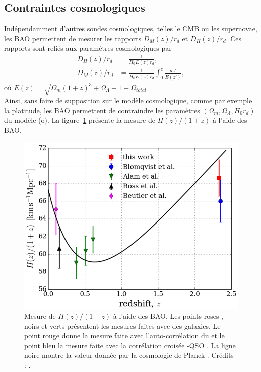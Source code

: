\subsection{Contraintes cosmologiques}
Indépendamment d'autres sondes cosmologiques, telles le CMB ou les supernovae, les BAO permettent de mesurer les rapports $D_M(z) / r_d$ et $D_H(z) / r_d$. Ces rapports sont reliés aux paramètres cosmologiques par
\begin{align}
  D_H(z) / r_d &= \frac{1}{H_0 E(z) r_d}, \\
  D_M(z) / r_d &= \frac{1}{H_0 E(z) r_d} \int_0^z \frac{dz'}{E(z')},
\end{align}
où $E(z) = \sqrt{\Omega_m (1+z)^3 + \Omega_{\Lambda} + 1 - \Omega_{total}}$. \\
Ainsi, sans faire de supposition sur le modèle cosmologique, comme par exemple la platitude, les BAO permettent de contraindre les paramètres $(\Omega_{m} , \Omega_{\Lambda} , H_0 r_d)$ du modèle (o)\lcdm{}.
La figure~\ref{fig:h_vs_z} présente la mesure de $H(z) / (1+z)$ à l'aide des BAO.
\begin{figure}
  \centering
  \includegraphics[scale=0.35]{h_vs_z}
  \caption{Mesure de $H(z) / (1+z)$ à l'aide des BAO. Les points roses \autocite{Beutler2011}, noirs \autocite{Ross2014a} et verts \autocite{Alam2016} présentent les mesures faites avec des galaxies. Le point rouge donne la mesure faite avec l'auto-corrélation du \lya{} \autocite{Agathe2019a} et le point bleu la mesure faite avec la corrélation croisée \lya{}-QSO \autocite{Blomqvist2019a}. La ligne noire montre la valeur donnée par la cosmologie de Planck \autocite{planck_collaboration_planck_2015}. Crédits : \textcite{Agathe2019a}.}
  \label{fig:h_vs_z}
\end{figure}

